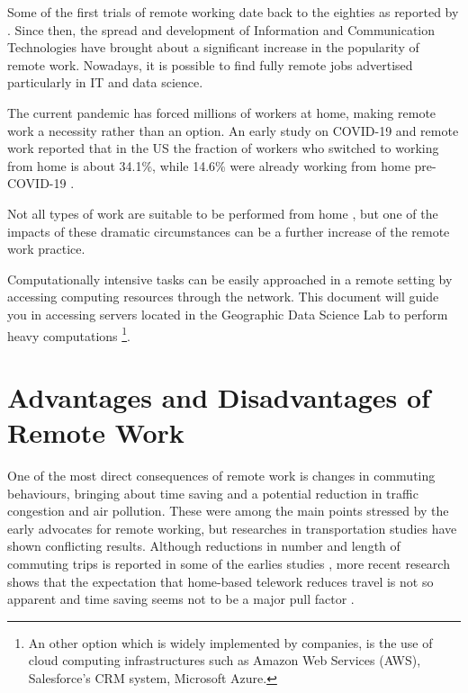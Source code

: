 \documentclass[
]{book}
\begin{document}
Some of the first trials of remote working date back to the eighties as reported by \citet{olson1983remote}. Since then, the spread and development of Information and Communication Technologies have brought about a significant increase in the popularity of remote work. Nowadays, it is possible to find fully remote jobs advertised particularly in IT and data science.

The current pandemic has forced millions of workers at home, making remote work a necessity rather than an option. An early study on COVID-19 and remote work reported that in the US the fraction of workers who switched to working from home is about 34.1\%, while 14.6\% were already working from home pre-COVID-19 \citep{brynjolfsson2020covid}.

Not all types of work are suitable to be performed from home \citep{holgersen2020and},
but one of the impacts of these dramatic circumstances can be a further increase of the remote work practice.

Computationally intensive tasks can be easily approached in a remote setting by accessing computing resources through the network. This document will guide you in accessing servers located in the Geographic Data Science Lab to perform heavy computations \footnote{An other option which is widely implemented by companies, is the use of cloud computing infrastructures such as Amazon Web Services (AWS), Salesforce's CRM system, Microsoft Azure.}.

\hypertarget{advantages-and-disadvantages-of-remote-work}{%
\section{Advantages and Disadvantages of Remote Work}\label{advantages-and-disadvantages-of-remote-work}}

One of the most direct consequences of remote work is changes in commuting behaviours, bringing about time saving and a potential reduction in traffic congestion and air pollution. These were among the main points stressed by the early advocates for remote working, but researches in transportation studies have shown conflicting results. Although reductions in number and length of commuting trips is reported in some of the earlies studies \citep{Kitamura1991, olson1983remote}, more recent research shows that the expectation that home-based telework reduces travel is not so apparent \citep{e2018does} and time saving seems not to be a major pull factor \citep{bailey2002review}.
\end{document}
